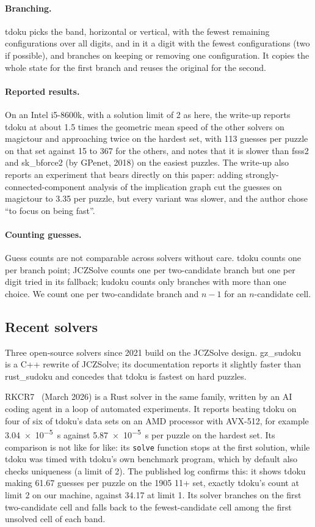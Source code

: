 \documentclass[11pt]{article}
\theoremstyle{definition}
\theoremstyle{plain}
\begin{document}
\paragraph{Branching.} tdoku picks the band, horizontal or vertical, with the fewest remaining configurations over all
digits, and in it a digit with the fewest configurations (two if possible), and branches on keeping or removing one
configuration. It copies the whole state for the first branch and reuses the original for the second.

\paragraph{Reported results.} On an Intel i5-8600k, with a solution limit of 2 as here, the write-up reports tdoku at
about 1.5 times the geometric mean speed of the other solvers on magictour and approaching twice on the hardest set,
with 113 guesses per puzzle on that set against 15 to 367 for the others, and notes that it is slower than fsss2 and
sk\_bforce2 (by GPenet, 2018) on the easiest puzzles. The write-up also reports an experiment that bears directly on
this paper: adding strongly-connected-component analysis of the implication graph cut the guesses on magictour to 3.35
per puzzle, but every variant was slower, and the author chose ``to focus on being fast''.

\paragraph{Counting guesses.} Guess counts are not comparable across solvers without care. tdoku counts one per branch
point; JCZSolve counts one per two-candidate branch but one per digit tried in its fallback; kudoku counts only
branches with more than one choice. We count one per two-candidate branch and $n-1$ for an $n$-candidate cell.

\subsection{Recent solvers}

Three open-source solvers since 2021 build on the JCZSolve design. gz\_sudoku~\cite{shines77_gzsudoku} is a C++ rewrite
of JCZSolve; its documentation reports it slightly faster than rust\_sudoku and concedes that tdoku is fastest on hard
puzzles.

RKCR7~\cite{rkcr7_2026autoresearch} (March 2026) is a Rust solver in the same family, written by an AI coding agent in
a loop of automated experiments. It reports beating tdoku on four of six of tdoku's data sets on an AMD processor with
AVX-512, for example \SI{3.04e-5}{\second} against \SI{5.87e-5}{\second} per puzzle on the hardest set. Its comparison is not like for like: its
\texttt{solve} function stops at the first solution, while tdoku was timed with tdoku's own benchmark program, which by
default also checks uniqueness (a limit of 2). The published log confirms this: it shows tdoku making 61.67 guesses per
puzzle on the 1905 11+ set, exactly tdoku's count at limit 2 on our machine, against 34.17 at limit 1. Its solver
branches on the first two-candidate cell and falls back to the fewest-candidate cell among the first unsolved cell of
each band.
\end{document}
